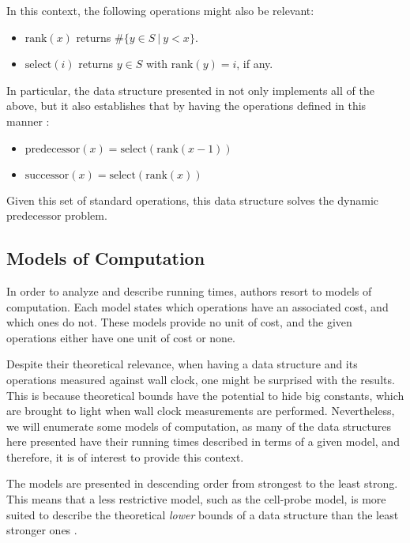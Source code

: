 In this context, the following operations might also be relevant:
\begin{itemize}
    \item
    $\text{rank}(x)$ returns $\#\{ y \in S\ |\ y < x\}$.
    \item
    $\text{select}(i)$ returns $y \in S$ with $\text{rank}(y) = i$, if any.
\end{itemize}

In particular, the data structure presented in \cite{patrascu2014dynamic} not only implements all of the above, but it also establishes that by having the operations defined in this manner \cite{patrascu2014dynamic}:
\begin{itemize}
    \item
    $\text{predecessor}(x) = \text{select}(\text{rank}(x - 1))$
    \item
    $\text{successor}(x) = \text{select}(\text{rank}(x))$
\end{itemize}

Given this set of standard operations, this data structure solves the dynamic predecessor problem.

\subsection{Models of Computation}\label{sec:modelsofcomputation}

In order to analyze and describe running times, authors resort to models of computation. Each model states which operations have an associated cost, and which ones do not.
These models provide no unit of cost, and the given operations either have one unit of cost or none.

Despite their theoretical relevance, when having a data structure and its operations measured against wall clock, one might be surprised with the results.
This is because theoretical bounds have the potential to hide big constants, which are brought to light when wall clock measurements are performed.
Nevertheless, we will enumerate some models of computation, as many of the data structures here presented have their running times described in terms of a given model, and therefore, it is of interest to provide this context.

The models are presented in descending order from strongest to the least strong. This means that a less restrictive model, such as the cell-probe model, is more suited to describe the theoretical \emph{lower} bounds of a data structure than the least stronger ones \cite{erikdemainelec11}.

